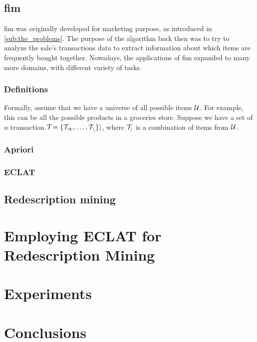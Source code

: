 \section{\Acl{fim}}
\Acl{fim} was originally developed for marketing purpose, as introduced in \autoref{sub:the_problems}.
The purpose of the algorithm back then was to try to analyze the sale's transactions data to extract information about which items are frequently bought together.
Nowadays, the applications of \acl{fim} expanded to many more domains, with different variety of tasks.
\subsection{Definitions}
Formally, assume that we have a universe of all possible items $\cal{U}$. For example, this can be all the possible products in a groceries store.
Suppose we have a set of $\mathit{n}$ transaction $\cal{T}_{} = \{\cal{T}_{1}, \dots, \cal{T}_{n}\}{} i$, where $\cal{T}_{i}$ is a combination of items from $\cal{U}$.
\subsection{Apriori}
\subsection{ECLAT}

\section{Redescription mining}


\chapter{Employing ECLAT for Redescription Mining}
\label{cha:employment}

\chapter{Experiments}
\label{cha:experiments}

\chapter{Conclusions}
\label{cha:conclusions}